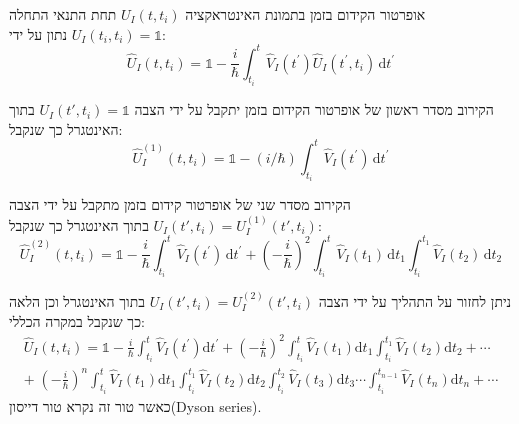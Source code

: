 \documentclass{tstextbook}
\begin{document}
\begin{corollary}
אופרטור הקידום בזמן בתמונת האינטראקציה \(U_{I}(t,t_{i})\) תחת התנאי התחלה \(U_{I}(t_{i},t_{i})=\mathbb{1}\) נתון על ידי:
$$\hat{U}_{I}(t,t_{i})=\mathbb{1} -\frac{i}{\hbar}\int_{t_{i}}^{t}\hat{V}_{I}\left( t^{\prime} \right)\hat{U}_{I}\left( t^{\prime},t_{i} \right)\,\mathrm{d}t^{\prime}$$

\end{corollary}
\begin{proposition}
הקירוב מסדר ראשון של אופרטור הקידום בזמן יתקבל על ידי הצבה \(U_{I}(t',t_{i})=\mathbb{1}\) בתוך האינטגרל כך שנקבל:
$$\hat{U}_{I}^{(1)}(t,t_{i})=\mathbb{1} -\left( i/\hbar \right)\int_{t_{i}}^{t}\hat{V}_{I}\left( t^{\prime} \right)\,\mathrm{d}t^{\prime}$$

\end{proposition}
\begin{proposition}
הקירוב מסדר שני של אופרטור קידום בזמן מתקבל על ידי הצבה \(U_{I}(t',t_{i})=U_{I}^{(1)}(t',t_{i})\) בתוך האינטגרל כך שנקבל:
$$\hat{U}_{I}^{(2)}(t,t_{i})=\mathbb{1} -\frac{i}{\hbar}\int_{t_{i}}^{t}\hat{V}_{I}\left( t^{\prime} \right)\,\mathrm{d}t^{\prime}+\left(-\frac{i}{\hbar}\right)^{2}\int_{t_{i}}^{t}\hat{V}_{I}(t_{1})\,\mathrm{d}t_{1}\int_{t_{i}}^{t_{1}}\hat{V}_{I}(t_{2})\,\mathrm{d}t_{2}$$

\end{proposition}
\begin{corollary}
ניתן לחזור על התהליך על ידי הצבה \(U_{I}(t',t_{i})=U_{I}^{(2)}(t',t_{i})\) בתוך האינטגרל וכן הלאה כך שנקבל במקרה הכללי:
$$\begin{gather}\hat{U}_{I}(t,t_{i})=\mathbb{1} -\frac{i}{\hbar}\int_{t_{i}}^{t}\hat{V}_{I}\left( t^{\prime} \right)\mathrm{d}t^{\prime}+\left(-\frac{i}{\hbar}\right)^{2}\int_{t_{i}}^{t}\hat{V}_{I}(t_{1})\mathrm{d}t_{1}\int_{t_{i}}^{t_{1}}\hat{V}_{I}(t_{2})\mathrm{d}t_{2}+\cdots \\ +\;\left(-\frac{i}{\hbar}\right)^{n}\!\!\int_{t_{i}}^{t}\hat{V}_{I}(t_{1})\mathrm{d}t_{1}\!\int_{t_{i}}^{t_{1}}\hat{V}_{I}(t_{2})\mathrm{d}t_{2}\!\int_{t_{i}}^{t_{2}}\hat{V}_{I}(t_{3})\mathrm{d}t_{3}\cdots\int_{t_{i}}^{t_{n-1}}\hat{V}_{I}(t_{n})\mathrm{d}t_{n}+\cdots 
\end{gather}$$
כאשר טור זה נקרא טור דייסון(Dyson series).

\end{corollary}
\end{document}
